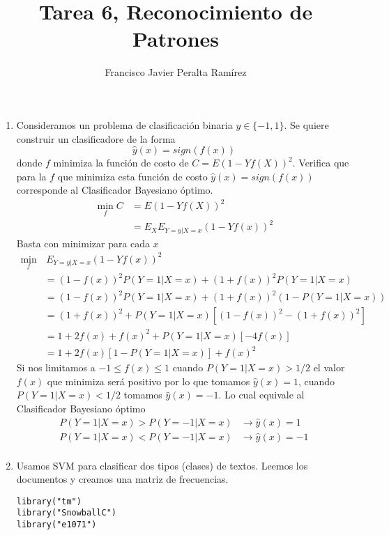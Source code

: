 \documentclass{article}
\title {Tarea 6, Reconocimiento de Patrones}
\author {Francisco Javier Peralta Ramírez}
\date{\vspace{-2ex}}
\begin{document}
\vspace{-2ex}
\maketitle
\begin{enumerate}

\item Consideramos un problema de clasificación binaria $y \in \{-1, 1\}$. Se quiere construir un clasificadore de la forma 
$$\hat{y}(x) = sign(f(x))$$
donde $f$ minimiza la función de costo de $C = E(1 - Yf(X))^2$. Verifica que para la $f$ que minimiza esta función de costo $ \hat{y}(x) = sign(f(x))$ corresponde al Clasificador Bayesiano óptimo.
\begin{align*}
\min_f C &= E(1 - Yf(X))^2\\
&= E_XE_{Y=y|X=x}(1 - Yf(x))^2
\end{align*}
Basta con minimizar para cada $x$
\begin{align*}
\min_f&\,  E_{Y=y|X=x}(1 - Yf(x))^2\\
&= (1-f(x))^2P(Y=1 | X=x) + (1+f(x))^2P(Y=1|X=x)\\
&= (1-f(x))^2P(Y=1 | X=x) + (1+f(x))^2(1-P(Y=1 | X=x))\\
&= (1+f(x))^2 + P(Y=1 | X=x)[ (1-f(x))^2 - (1+f(x))^2 ]\\
&= 1 + 2f(x) + f(x)^2 + P(Y=1 | X=x)[ -4f(x) ]\\
&= 1 + 2f(x)[1 - P(Y=1 | X=x)] + f(x)^2
\end{align*}
Si nos limitamos a $-1 \leq f(x) \leq 1$ cuando $ P(Y=1 | X=x) > 1/2$ el valor $f(x)$ que minimiza será positivo por lo que tomamos $\hat{y}(x) = 1$, cuando $P(Y=1 | X=x) < 1/2$ tomamos $\hat{y}(x) = -1$. Lo cual equivale al Clasificador Bayesiano óptimo
\begin{align*}
P(Y=1 | X=x) > P(Y= -1 | X=x) &\rightarrow \hat{y}(x) = 1\\
P(Y=1 | X=x) < P(Y= -1 | X=x) &\rightarrow \hat{y}(x) = -1\\
\end{align*}

\item Usamos SVM para clasificar dos tipos (clases) de textos.
Leemos los documentos y creamos una matriz de frecuencias.
\begin{lstlisting}
library("tm")
library("SnowballC")
library("e1071")


\end{lstlisting}
\end{enumerate}
\end{document}
